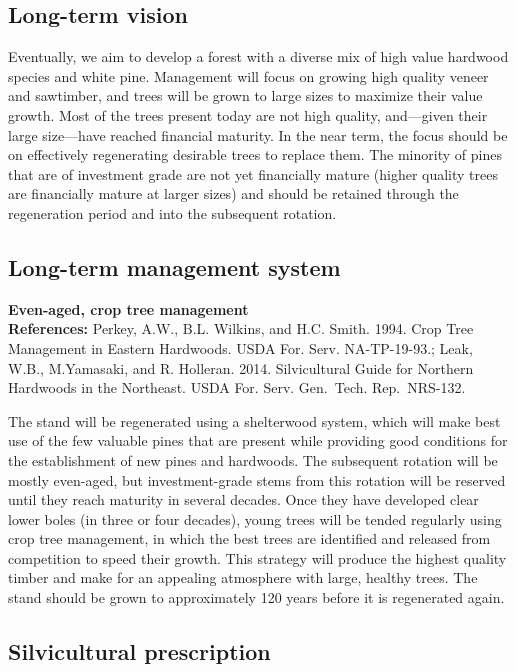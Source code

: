 \documentclass[]{tufte-handout}
\begin{document}
\subsection{Long-term vision}\label{long-term-vision}

Eventually, we aim to develop a forest with a diverse mix of high value
hardwood species and white pine. Management will focus on growing high
quality veneer and sawtimber, and trees will be grown to large sizes to
maximize their value growth. Most of the trees present today are not
high quality, and---given their large size---have reached financial
maturity. In the near term, the focus should be on effectively
regenerating desirable trees to replace them. The minority of pines that
are of investment grade are not yet financially mature (higher quality
trees are financially mature at larger sizes) and should be retained
through the regeneration period and into the subsequent rotation.

\subsection{Long-term management
system}\label{long-term-management-system}

\textbf{Even-aged, crop tree management}\\
\textbf{References:} Perkey, A.W., B.L. Wilkins, and H.C. Smith. 1994.
Crop Tree Management in Eastern Hardwoods. USDA For. Serv. NA-TP-19-93.;
Leak, W.B., M.Yamasaki, and R. Holleran. 2014. Silvicultural Guide for
Northern Hardwoods in the Northeast. USDA For. Serv. Gen.~Tech.
Rep.~NRS-132.

The stand will be regenerated using a shelterwood system, which will
make best use of the few valuable pines that are present while providing
good conditions for the establishment of new pines and hardwoods. The
subsequent rotation will be mostly even-aged, but investment-grade stems
from this rotation will be reserved until they reach maturity in several
decades. Once they have developed clear lower boles (in three or four
decades), young trees will be tended regularly using crop tree
management, in which the best trees are identified and released from
competition to speed their growth. This strategy will produce the
highest quality timber and make for an appealing atmosphere with large,
healthy trees. The stand should be grown to approximately 120 years
before it is regenerated again.

\subsection{Silvicultural
prescription}\label{silvicultural-prescription}
\end{document}
